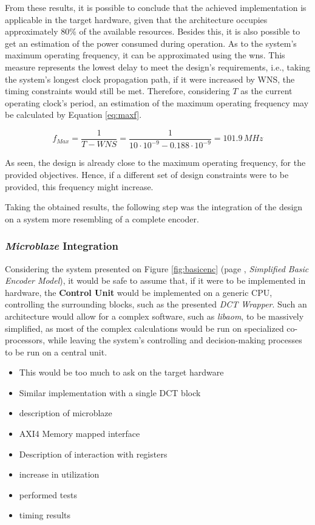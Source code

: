 From these results, it is possible to conclude that the achieved implementation is applicable in the target hardware, given that the architecture occupies approximately 80\% of the available resources. Besides this, it is also possible to get an estimation of the power consumed during operation. As to the system's maximum operating frequency, it can be approximated using the \gls{wns}. This measure represents the lowest delay to meet the design's requirements, i.e., taking the system's longest clock propagation path, if it were increased by WNS, the timing constraints would still be met. Therefore, considering $T$ as the current operating clock's period, an estimation of the maximum operating frequency may be calculated by Equation \ref{eq:maxf}.

\begin{equation} \label{eq:maxf}
    f_{Max} = \frac{1}{T-WNS} = \frac{1}{10\cdot 10^{-9} - 0.188\cdot 10^{-9}} = 101.9\,MHz
\end{equation}

As seen, the design is already close to the maximum operating frequency, for the provided objectives. Hence, if a different set of design constraints were to be provided, this frequency might increase.

Taking the obtained results, the following step was the integration of the design on a system more resembling of a complete encoder.

\subsubsection{\emph{Microblaze} Integration} \label{sec:microblaze}

Considering the system presented on Figure \ref{fig:basicenc} (page \pageref{fig:basicenc}, \emph{Simplified Basic Encoder Model}), it would be safe to assume that, if it were to be implemented in hardware, the \textbf{Control Unit} would be implemented on a generic CPU, controlling the surrounding blocks, such as the presented \emph{DCT Wrapper}. Such an architecture would allow for a complex software, such as \emph{libaom}, to be massively simplified, as most of the complex calculations would be run on specialized co-processors, while leaving the system's controlling and decision-making processes to be run on a central unit.

\begin{itemize}
    \item This would be too much to ask on the target hardware
    \item Similar implementation with a single DCT block
    \item description of microblaze
    \item AXI4 Memory mapped interface
    \item Description of interaction with registers
    \item increase in utilization
    \item performed tests
    \item timing results
\end{itemize}


\clearpage
\printbibliography[heading=subbibliography]
